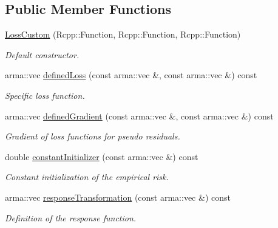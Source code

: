 \subsection*{Public Member Functions}
\begin{DoxyCompactItemize}
\item 
\mbox{\hyperlink{classloss_1_1_loss_custom_a66d5f9be1b6096eded07a3e667d368ab}{Loss\+Custom}} (Rcpp\+::\+Function, Rcpp\+::\+Function, Rcpp\+::\+Function)
\begin{DoxyCompactList}\small\item\em Default constructor. \end{DoxyCompactList}\item 
arma\+::vec \mbox{\hyperlink{classloss_1_1_loss_custom_ad71351d35d7739651c487c2106571118}{defined\+Loss}} (const arma\+::vec \&, const arma\+::vec \&) const
\begin{DoxyCompactList}\small\item\em Specific loss function. \end{DoxyCompactList}\item 
arma\+::vec \mbox{\hyperlink{classloss_1_1_loss_custom_a91761ef42f85914dde2c3e6dd7fa1a0c}{defined\+Gradient}} (const arma\+::vec \&, const arma\+::vec \&) const
\begin{DoxyCompactList}\small\item\em Gradient of loss functions for pseudo residuals. \end{DoxyCompactList}\item 
double \mbox{\hyperlink{classloss_1_1_loss_custom_a0c8abe2bf210898813d2f9e5049cc1e8}{constant\+Initializer}} (const arma\+::vec \&) const
\begin{DoxyCompactList}\small\item\em Constant initialization of the empirical risk. \end{DoxyCompactList}\item 
arma\+::vec \mbox{\hyperlink{classloss_1_1_loss_custom_a42d9a0131836a056551c1073474cc8b9}{response\+Transformation}} (const arma\+::vec \&) const
\begin{DoxyCompactList}\small\item\em Definition of the response function. \end{DoxyCompactList}\end{DoxyCompactItemize}
